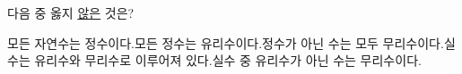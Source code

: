 다음 중 옳지 \underline{않은} 것은?
\begin{choicesv}{모든 자연수는 정수이다.}{모든 정수는 유리수이다.}{정수가 아닌 수는 모두 무리수이다.}{실수는 유리수와 무리수로 이루어져 있다.}{실수 중 유리수가 아닌 수는 무리수이다.}\end{choicesv}
